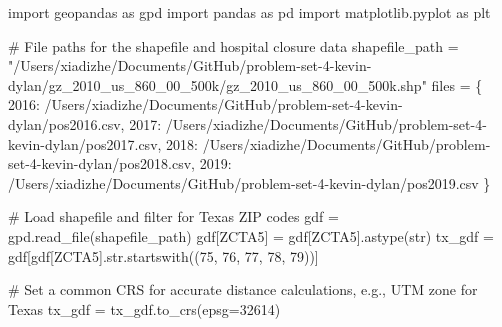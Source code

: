 \documentclass[
  letterpaper,
  DIV=11,
  numbers=noendperiod]{scrartcl}
\newenvironment{Shaded}{\begin{snugshade}}{\end{snugshade}}
\newcommand{\BuiltInTok}[1]{\textcolor[rgb]{0.00,0.23,0.31}{#1}}
\newcommand{\CommentTok}[1]{\textcolor[rgb]{0.37,0.37,0.37}{#1}}
\newcommand{\DecValTok}[1]{\textcolor[rgb]{0.68,0.00,0.00}{#1}}
\newcommand{\ImportTok}[1]{\textcolor[rgb]{0.00,0.46,0.62}{#1}}
\newcommand{\NormalTok}[1]{\textcolor[rgb]{0.00,0.23,0.31}{#1}}
\newcommand{\OperatorTok}[1]{\textcolor[rgb]{0.37,0.37,0.37}{#1}}
\newcommand{\StringTok}[1]{\textcolor[rgb]{0.13,0.47,0.30}{#1}}
\begin{document}
\begin{Shaded}
\begin{Highlighting}[]
\ImportTok{import}\NormalTok{ geopandas }\ImportTok{as}\NormalTok{ gpd}
\ImportTok{import}\NormalTok{ pandas }\ImportTok{as}\NormalTok{ pd}
\ImportTok{import}\NormalTok{ matplotlib.pyplot }\ImportTok{as}\NormalTok{ plt}

\CommentTok{\# File paths for the shapefile and hospital closure data}
\NormalTok{shapefile\_path }\OperatorTok{=} \StringTok{"/Users/xiadizhe/Documents/GitHub/problem{-}set{-}4{-}kevin{-}dylan/gz\_2010\_us\_860\_00\_500k/gz\_2010\_us\_860\_00\_500k.shp"}
\NormalTok{files }\OperatorTok{=}\NormalTok{ \{}
    \DecValTok{2016}\NormalTok{: }\StringTok{\textquotesingle{}/Users/xiadizhe/Documents/GitHub/problem{-}set{-}4{-}kevin{-}dylan/pos2016.csv\textquotesingle{}}\NormalTok{,}
    \DecValTok{2017}\NormalTok{: }\StringTok{\textquotesingle{}/Users/xiadizhe/Documents/GitHub/problem{-}set{-}4{-}kevin{-}dylan/pos2017.csv\textquotesingle{}}\NormalTok{,}
    \DecValTok{2018}\NormalTok{: }\StringTok{\textquotesingle{}/Users/xiadizhe/Documents/GitHub/problem{-}set{-}4{-}kevin{-}dylan/pos2018.csv\textquotesingle{}}\NormalTok{,}
    \DecValTok{2019}\NormalTok{: }\StringTok{\textquotesingle{}/Users/xiadizhe/Documents/GitHub/problem{-}set{-}4{-}kevin{-}dylan/pos2019.csv\textquotesingle{}}
\NormalTok{\}}

\CommentTok{\# Load shapefile and filter for Texas ZIP codes}
\NormalTok{gdf }\OperatorTok{=}\NormalTok{ gpd.read\_file(shapefile\_path)}
\NormalTok{gdf[}\StringTok{\textquotesingle{}ZCTA5\textquotesingle{}}\NormalTok{] }\OperatorTok{=}\NormalTok{ gdf[}\StringTok{\textquotesingle{}ZCTA5\textquotesingle{}}\NormalTok{].astype(}\BuiltInTok{str}\NormalTok{)}
\NormalTok{tx\_gdf }\OperatorTok{=}\NormalTok{ gdf[gdf[}\StringTok{\textquotesingle{}ZCTA5\textquotesingle{}}\NormalTok{].}\BuiltInTok{str}\NormalTok{.startswith((}\StringTok{\textquotesingle{}75\textquotesingle{}}\NormalTok{, }\StringTok{\textquotesingle{}76\textquotesingle{}}\NormalTok{, }\StringTok{\textquotesingle{}77\textquotesingle{}}\NormalTok{, }\StringTok{\textquotesingle{}78\textquotesingle{}}\NormalTok{, }\StringTok{\textquotesingle{}79\textquotesingle{}}\NormalTok{))]}

\CommentTok{\# Set a common CRS for accurate distance calculations, e.g., UTM zone for Texas}
\NormalTok{tx\_gdf }\OperatorTok{=}\NormalTok{ tx\_gdf.to\_crs(epsg}\OperatorTok{=}\DecValTok{32614}\NormalTok{)}


\end{Highlighting}
\end{Shaded}
\end{document}

